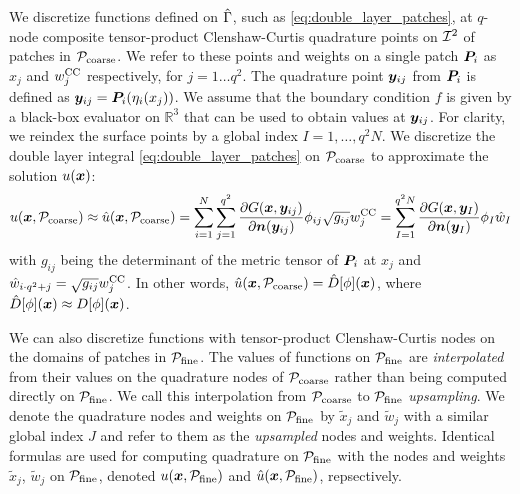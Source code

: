 We discretize functions defined on $\hat{\Gamma}$, such as
\cref{eq:double_layer_patches}, at $q$-node composite tensor-product
Clenshaw-Curtis quadrature points on ${\mathcal{I}}^2$ of patches in ${\mathcal{P}_{\mathrm{coarse}}}$.  
We refer to these points and weights on a single patch ${\bm{P}}_i$ as $x_j$ and $w_j^{\mathrm{CC}}$ respectively, for $j = 1\ldots q^2$. 
The quadrature point ${\bm{y}}_{ij}$ from ${\bm{P}}_i$ is defined as ${\bm{y}}_{ij} = {\bm{P}}_{i}(\eta_i(x_j))$. 
We assume that the boundary condition $f$ is given by a black-box evaluator on $\mathbb{R}^3$ that can be used to obtain values at ${\bm{y}}_{ij}$.
For clarity, we reindex the surface points by a global index $I = 1, \hdots, q^2N$.
We discretize the double layer integral \cref{eq:double_layer_patches} on ${\mathcal{P}_{\mathrm{coarse}}}$ to approximate the solution $u({\bm{x}})$:
\begin{equation}
    u({\bm{x}},{\mathcal{P}_{\mathrm{coarse}}}) \approx \hat{u}({\bm{x}},{\mathcal{P}_{\mathrm{coarse}}}) = \sum_{i=1}^N\sum_{j=1}^{q^2} \frac{\partial G({\bm{x}},{\bm{y}}_{ij})}{\partial {\bm{n}}({\bm{y}}_{ij})} \phi_{ij} \sqrt{g_{ij}}w_j^{\mathrm{CC}} 
    = \sum_{I=1}^{q^2N}\frac{\partial G({\bm{x}},{\bm{y}}_I)}{\partial {\bm{n}}({\bm{y}}_I)} \phi_I \hat{w}_I
  \label{eq:double_layer_disc}
\end{equation}
with $g_{ij}$ being the determinant of the metric tensor of ${\bm{P}}_i$ at $x_j$ and $\hat{w}_{i\cdot q^2+j} = \sqrt{g_{ij}}w_{j}^{\mathrm{CC}}$.
In other words, $\hat{u}({\bm{x}}, {\mathcal{P}_{\mathrm{coarse}}}) = \hat{D}[\phi]({\bm{x}})$, where $\hat{D}[\phi]({\bm{x}}) \approx D[\phi]({\bm{x}})$.

We can also discretize functions with tensor-product Clenshaw-Curtis nodes on the domains of patches in ${\mathcal{P}_{\mathrm{fine}}}$.
The values of functions on ${\mathcal{P}_{\mathrm{fine}}}$ are \emph{interpolated} from their values on the quadrature nodes of ${\mathcal{P}_{\mathrm{coarse}}}$ rather than being computed directly on ${\mathcal{P}_{\mathrm{fine}}}$.
We call this interpolation from ${\mathcal{P}_{\mathrm{coarse}}}$ to ${\mathcal{P}_{\mathrm{fine}}}$ \textit{upsampling}.
We denote the quadrature nodes and weights on ${\mathcal{P}_{\mathrm{fine}}}$ by $\tilde{x}_j$ and $\tilde{w}_j$ with a similar global index $J$ and refer to them as the \textit{upsampled} nodes and weights.
Identical formulas are used for computing quadrature on ${\mathcal{P}_{\mathrm{fine}}}$ with the nodes and weights $\tilde{x}_j$, $\tilde{w}_j$ on ${\mathcal{P}_{\mathrm{fine}}}$, denoted $u({\bm{x}},{\mathcal{P}_{\mathrm{fine}}})$ and $\hat{u}({\bm{x}},{\mathcal{P}_{\mathrm{fine}}})$, repsectively.

